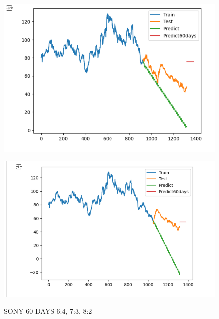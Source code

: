 \documentclass{article}
\begin{document}
\begin{multicols}{2}
\begin{figure}[H]
\begin{minipage}{0.15\textwidth}
    \label{fig:1}
    \end{minipage}%
    \begin{minipage}{0.15\textwidth}
    \centering
    \includegraphics[width=1\textwidth]{Image/ARIMA/60_7_3_SONY_Arima.png}
  
    \label{fig:2}
    \end{minipage}%
    \begin{minipage}{0.15\textwidth}
    \centering
    \includegraphics[width=1\textwidth]{Image/ARIMA/60_8_2_SONY_Arima.png}

    \label{fig:3}
    \end{minipage}
    \caption{SONY 60 DAYS  6:4, 7:3, 8:2 }
\end{figure}



\end{multicols}
\end{document}
